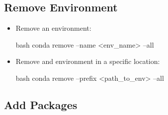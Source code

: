 
\subsection{Remove Environment}

\begin{itemize}
    \item Remove an environment:
    \begin{mintedbox}{bash}
conda remove --name <env_name> --all
    \end{mintedbox}
    \item Remove and environment in a specific location:
    \begin{mintedbox}{bash}
conda remove --prefix <path_to_env> --all
    \end{mintedbox}
\end{itemize}


\subsection{Add Packages}

